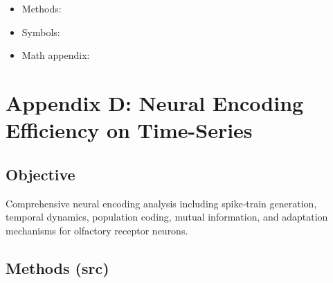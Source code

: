 \documentclass[
  13pt,
  a4paperpaper,
  12pt]{article}
\providecommand{\tightlist}{%
  \setlength{\itemsep}{0pt}\setlength{\parskip}{0pt}}
\let\oldsection\section
\renewcommand{\section}{\clearpage\oldsection}
\begin{document}
\begin{itemize}
\tightlist
\item
  Methods: 
\item
  Symbols: 
\item
  Math appendix: 
\end{itemize}

\section{Appendix D: Neural Encoding Efficiency on
Time-Series}\label{sec:app_neural_encoding}

\subsection{Objective}\label{objective-3}

Comprehensive neural encoding analysis including spike‑train generation,
temporal dynamics, population coding, mutual information, and adaptation
mechanisms for olfactory receptor neurons.

\subsection{Methods (src)}\label{methods-src-3}
\end{document}
